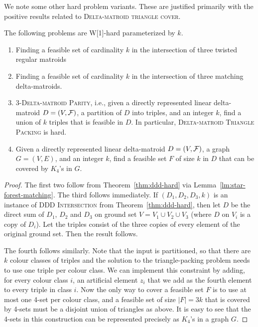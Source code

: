 We note some other hard problem variants. These are justified primarily with the positive results related to
\textsc{Delta-matroid triangle cover}.

\begin{corollary}
  The following problems are W[1]-hard parameterized by $k$.
  \begin{enumerate}
  \item Finding a feasible set of cardinality $k$ in the intersection of three twisted regular matroids
  \item Finding a feasible set of cardinality $k$ in the intersection of three matching delta-matroids.
  \item \textsc{3-Delta-matroid Parity}, i.e., given
    a directly represented linear delta-matroid $D=(V,\mathcal F)$,
    a partition of $D$ into triples, and an integer $k$, 
    find a union of $k$ triples that is feasible in $D$.
    In particular, \textsc{Delta-matroid Triangle Packing} is hard. 
  \item Given a directly represented linear delta-matroid $D=(V,\mathcal F)$,
    a graph $G=(V,E)$, and an integer $k$, find a feasible
    set $F$ of size $k$ in $D$ that can be covered by $K_4$'s in $G$.
  \end{enumerate}
\end{corollary}
\begin{proof}
  The first two follow from Theorem~\ref{thm:ddd-hard}
  via Lemma~\ref{lm:star-forest-matching}.
  The third follows immediately. If $(D_1,D_2,D_3,k)$ is an instance of
  \textsc{DDD Intersection} from Theorem~\ref{thm:ddd-hard},
  then let $D$ be the direct sum of $D_1$, $D_2$ and $D_3$
  on ground set $V=V_1 \cup V_2 \cup V_3$ (where $D$ on $V_i$ is a copy of $D_i$).
  Let the triples consist of the three copies of every element
  of the original ground set. Then the result follows. 
  
  The fourth follows similarly. Note that the input is partitioned,
  so that there are $k$ colour classes of triples and the solution
  to the triangle-packing problem needs to use one triple per colour
  class. We can implement this constraint by adding, for every
  colour class $i$, an artificial element $z_i$ that we add as the
  fourth element to every triple in class $i$. Now the only way to
  cover a feasible set $F$ is to use at most one 4-set per colour
  class, and a feasible set of size $|F|=3k$ that is covered by 4-sets
  must be a disjoint union of triangles as above.
  It is easy to see that the 4-sets in this construction can be
  represented precisely as $K_4$'s in a graph $G$. 
\end{proof}

